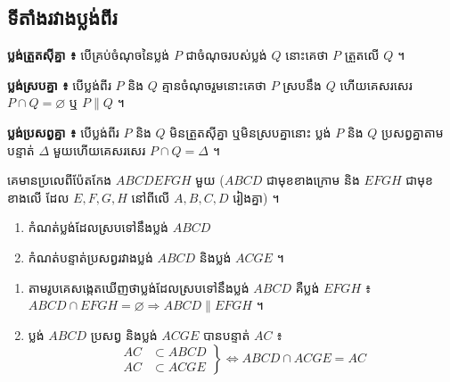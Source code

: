 \subsection{ទីតាំងរវាងប្លង់ពីរ}
\textbf{ប្លង់ត្រួតស៊ីគ្នា ៖} បើគ្រប់ចំណុចនៃប្លង់ $P$ ជាចំណុចរបស់ប្លង់ $Q$ នោះគេថា $P$ ត្រួតលើ $Q$ ។

\textbf{ប្លង់ស្របគ្នា ៖} បើប្លង់ពីរ $P$ និង $Q$ គ្មានចំណុចរួមនោះគេថា $P$ ស្របនឹង $Q$ ហើយគេសរសេរ $P \cap Q = \varnothing$ ឬ $P \parallel Q$ ។

\textbf{ប្លង់ប្រសព្វគ្នា ៖} បើប្លង់ពីរ $P$ និង $Q$ មិនត្រួតស៊ីគ្នា ឬមិនស្របគ្នានោះ ប្លង់ $P$ និង $Q$ ប្រសព្វគ្នាតាមបន្ទាត់ $\Delta$ មួយហើយគេសរសេរ $P \cap Q = \Delta$ ។
\begin{center}
\end{center}

\begin{example}[លំហាត់គំរូ]
គេមានប្រលេពីប៉ែតកែង $ABCDEFGH$ មួយ ($ABCD$ ជាមុខខាងក្រោម និង $EFGH$ ជាមុខខាងលើ ដែល $E, F, G, H$ នៅពីលើ $A, B, C, D$ រៀងគ្នា) ។
\begin{enumerate}[a]
  \item កំណត់ប្លង់ដែលស្របទៅនឹងប្លង់ $ABCD$
  \item កំណត់បន្ទាត់ប្រសព្វរវាងប្លង់ $ABCD$ និងប្លង់ $ACGE$ ។
\end{enumerate}
\ans
\begin{enumerate}[a]
  \item តាមរូបគេសង្កេតឃើញថាប្លង់ដែលស្របទៅនឹងប្លង់ $ABCD$ គឺប្លង់ $EFGH$ ៖ $ABCD \cap EFGH = \varnothing \Rightarrow ABCD \parallel EFGH$ ។
  \item ប្លង់ $ABCD$ ប្រសព្វ និងប្លង់ $ACGE$ បានបន្ទាត់ $AC$ ៖
  \[
  \left.\begin{aligned} AC &\subset ABCD\\ AC &\subset ACGE \end{aligned}\right\} \Leftrightarrow ABCD \cap ACGE = AC
  \]
\end{enumerate}
\end{example}

